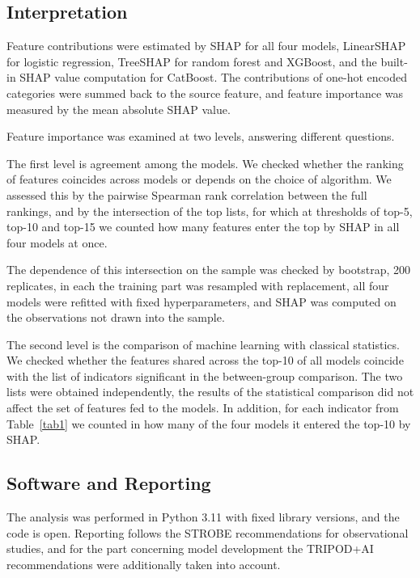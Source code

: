 \documentclass[pdflatex,sn-basic,Numbered]{sn-jnl}
\begin{document}
\subsection{Interpretation}\label{subsec2_10}

Feature contributions were estimated by SHAP for all four models, LinearSHAP for logistic regression, TreeSHAP for random forest and XGBoost, and the built-in SHAP value computation for CatBoost. The contributions of one-hot encoded categories were summed back to the source feature, and feature importance was measured by the mean absolute SHAP value.

Feature importance was examined at two levels, answering different questions.

The first level is agreement among the models. We checked whether the ranking of features coincides across models or depends on the choice of algorithm. We assessed this by the pairwise Spearman rank correlation between the full rankings, and by the intersection of the top lists, for which at thresholds of top-5, top-10 and top-15 we counted how many features enter the top by SHAP in all four models at once.

The dependence of this intersection on the sample was checked by bootstrap, 200 replicates, in each the training part was resampled with replacement, all four models were refitted with fixed hyperparameters, and SHAP was computed on the observations not drawn into the sample.

The second level is the comparison of machine learning with classical statistics. We checked whether the features shared across the top-10 of all models coincide with the list of indicators significant in the between-group comparison. The two lists were obtained independently, the results of the statistical comparison did not affect the set of features fed to the models. In addition, for each indicator from Table~\ref{tab1} we counted in how many of the four models it entered the top-10 by SHAP.

\subsection{Software and Reporting}\label{subsec2_11}

The analysis was performed in Python 3.11 with fixed library versions, and the code is open. Reporting follows the STROBE recommendations for observational studies, and for the part concerning model development the TRIPOD+AI recommendations were additionally taken into account.
\end{document}
